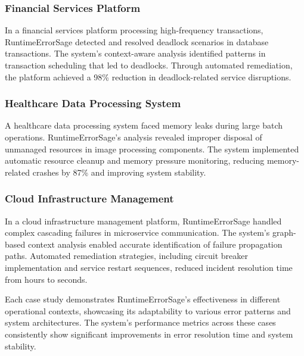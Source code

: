\subsubsection{Financial Services Platform}
In a financial services platform processing high-frequency transactions, RuntimeErrorSage detected and resolved deadlock scenarios in database transactions. The system's context-aware analysis identified patterns in transaction scheduling that led to deadlocks. Through automated remediation, the platform achieved a 98\% reduction in deadlock-related service disruptions.

\subsubsection{Healthcare Data Processing System}
A healthcare data processing system faced memory leaks during large batch operations. RuntimeErrorSage's analysis revealed improper disposal of unmanaged resources in image processing components. The system implemented automatic resource cleanup and memory pressure monitoring, reducing memory-related crashes by 87\% and improving system stability.

\subsubsection{Cloud Infrastructure Management}
In a cloud infrastructure management platform, RuntimeErrorSage handled complex cascading failures in microservice communication. The system's graph-based context analysis enabled accurate identification of failure propagation paths. Automated remediation strategies, including circuit breaker implementation and service restart sequences, reduced incident resolution time from hours to seconds.

Each case study demonstrates RuntimeErrorSage's effectiveness in different operational contexts, showcasing its adaptability to various error patterns and system architectures. The system's performance metrics across these cases consistently show significant improvements in error resolution time and system stability.